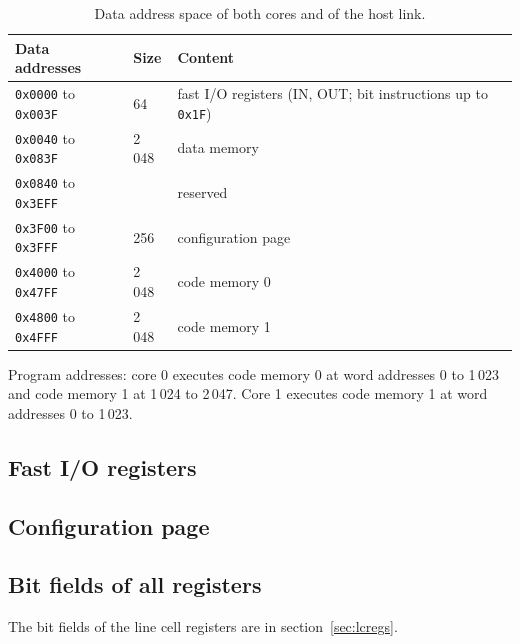 \documentclass[10pt,a4paper]{article}
\begin{document}
\begin{table}[H]
\centering\small
\begin{tabularx}{\linewidth}{@{}llL@{}}
\toprule
Data addresses & Size & Content \\
\midrule
\texttt{0x0000} to \texttt{0x003F} & 64 & fast I/O registers (IN, OUT; bit instructions up to \texttt{0x1F}) \\
\texttt{0x0040} to \texttt{0x083F} & 2\,048 & data memory \\
\texttt{0x0840} to \texttt{0x3EFF} & & reserved \\
\texttt{0x3F00} to \texttt{0x3FFF} & 256 & configuration page \\
\texttt{0x4000} to \texttt{0x47FF} & 2\,048 & code memory 0 \\
\texttt{0x4800} to \texttt{0x4FFF} & 2\,048 & code memory 1 \\
\bottomrule
\end{tabularx}
\caption{Data address space of both cores and of the host link.}
\end{table}

Program addresses: core 0 executes code memory 0 at word addresses 0 to 1\,023 and code memory 1 at 1\,024 to
2\,047. Core 1 executes code memory 1 at word addresses 0 to 1\,023.

\subsection{Fast I/O registers}



\subsection{Configuration page}



\subsection{Bit fields of all registers}

The bit fields of the line cell registers are in section~\ref{sec:lcregs}.


\end{document}
